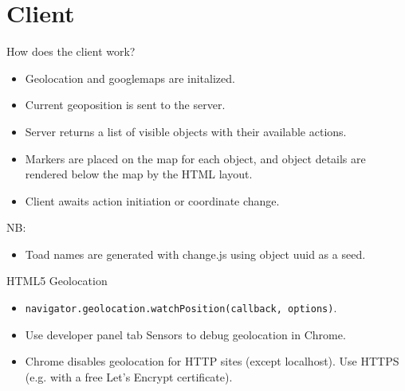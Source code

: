 \documentclass[aspectratio=169,handout,bigger]{beamer}
\begin{document}

\section{Client}


\begin{frame}{How does the client work?}
  \begin{itemize}
    \item Geolocation and googlemaps are initalized.
    \item Current geoposition is sent to the server.
    \item Server returns a list of visible objects with their available actions.
    \item Markers are placed on the map for each object,
          and object details are rendered below the map by the HTML layout.
    \item Client awaits action initiation or coordinate change.
  \end{itemize}
  \vspace*{1em}\par
  NB:
  \begin{itemize}
    \item Toad names are generated with change.js using object uuid as a seed.
  \end{itemize}
\end{frame}


\begin{frame}{HTML5 Geolocation}
  \begin{itemize}
    \item \texttt{navigator.geolocation.watchPosition(callback, options)}.
    \item Use developer panel tab Sensors to debug geolocation in Chrome.
    \item Chrome disables geolocation for HTTP sites (except localhost).
          Use HTTPS (e.g. with a free Let's Encrypt certificate).
  \end{itemize}
\end{frame}

\end{document}
